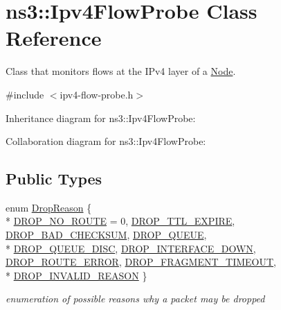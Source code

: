 \hypertarget{classns3_1_1Ipv4FlowProbe}{}\section{ns3\+:\+:Ipv4\+Flow\+Probe Class Reference}
\label{classns3_1_1Ipv4FlowProbe}


Class that monitors flows at the I\+Pv4 layer of a \hyperlink{classns3_1_1Node}{Node}.  




{\ttfamily \#include $<$ipv4-\/flow-\/probe.\+h$>$}



Inheritance diagram for ns3\+:\+:Ipv4\+Flow\+Probe\+:


Collaboration diagram for ns3\+:\+:Ipv4\+Flow\+Probe\+:
\subsection*{Public Types}
\begin{DoxyCompactItemize}
\item 
enum \hyperlink{classns3_1_1Ipv4FlowProbe_a035ac54633cca2eec144e14f0dcf4179}{Drop\+Reason} \{ \\*
\hyperlink{classns3_1_1Ipv4FlowProbe_a035ac54633cca2eec144e14f0dcf4179a788583a6bda127b650efb4ad2f194dfa}{D\+R\+O\+P\+\_\+\+N\+O\+\_\+\+R\+O\+U\+TE} = 0, 
\hyperlink{classns3_1_1Ipv4FlowProbe_a035ac54633cca2eec144e14f0dcf4179a17b6754e3723d8983e17dfee84f2edd4}{D\+R\+O\+P\+\_\+\+T\+T\+L\+\_\+\+E\+X\+P\+I\+RE}, 
\hyperlink{classns3_1_1Ipv4FlowProbe_a035ac54633cca2eec144e14f0dcf4179a0f8cc3d4cdef6bd11db276991ba5be83}{D\+R\+O\+P\+\_\+\+B\+A\+D\+\_\+\+C\+H\+E\+C\+K\+S\+UM}, 
\hyperlink{classns3_1_1Ipv4FlowProbe_a035ac54633cca2eec144e14f0dcf4179ae1b5d1b2d1f85fdb346e70c3d4cdc66d}{D\+R\+O\+P\+\_\+\+Q\+U\+E\+UE}, 
\\*
\hyperlink{classns3_1_1Ipv4FlowProbe_a035ac54633cca2eec144e14f0dcf4179ac8adea45ab950ee1313a91b4d69fd6a7}{D\+R\+O\+P\+\_\+\+Q\+U\+E\+U\+E\+\_\+\+D\+I\+SC}, 
\hyperlink{classns3_1_1Ipv4FlowProbe_a035ac54633cca2eec144e14f0dcf4179a70419383e53bbcc568c10c69f5084f6f}{D\+R\+O\+P\+\_\+\+I\+N\+T\+E\+R\+F\+A\+C\+E\+\_\+\+D\+O\+WN}, 
\hyperlink{classns3_1_1Ipv4FlowProbe_a035ac54633cca2eec144e14f0dcf4179a0a724e0ab6697453a260527f3a7a6893}{D\+R\+O\+P\+\_\+\+R\+O\+U\+T\+E\+\_\+\+E\+R\+R\+OR}, 
\hyperlink{classns3_1_1Ipv4FlowProbe_a035ac54633cca2eec144e14f0dcf4179adf9598ecb45c5ef84c3bd0a54f6143bb}{D\+R\+O\+P\+\_\+\+F\+R\+A\+G\+M\+E\+N\+T\+\_\+\+T\+I\+M\+E\+O\+UT}, 
\\*
\hyperlink{classns3_1_1Ipv4FlowProbe_a035ac54633cca2eec144e14f0dcf4179ac35ddf87d8b17302be103ec557e26c04}{D\+R\+O\+P\+\_\+\+I\+N\+V\+A\+L\+I\+D\+\_\+\+R\+E\+A\+S\+ON}
 \}\begin{DoxyCompactList}\small\item\em enumeration of possible reasons why a packet may be dropped \end{DoxyCompactList}
\end{DoxyCompactItemize}
